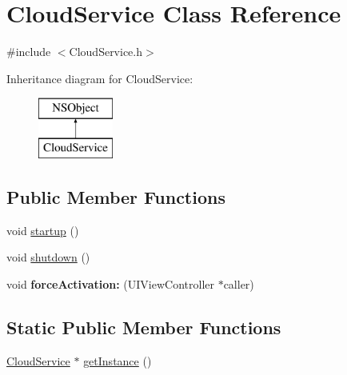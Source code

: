 \hypertarget{interface_cloud_service}{
\section{\-Cloud\-Service \-Class \-Reference}
\label{interface_cloud_service}
}


{\ttfamily \#include $<$\-Cloud\-Service.\-h$>$}

\-Inheritance diagram for \-Cloud\-Service\-:\begin{figure}[H]
\begin{center}
\leavevmode
\includegraphics[height=2.000000cm]{interface_cloud_service}
\end{center}
\end{figure}
\subsection*{\-Public \-Member \-Functions}
\begin{DoxyCompactItemize}
\item 
void \hyperlink{interface_cloud_service_aff6031f833c1fb320f87426fca9e11eb}{startup} ()
\item 
void \hyperlink{interface_cloud_service_ad3ebffc5f1cddabf2480d14d987de69f}{shutdown} ()
\item 
\hypertarget{interface_cloud_service_a59f48bd9bd6a06315ec5f1e946cfb1c1}{
void {\bfseries force\-Activation\-:} (\-U\-I\-View\-Controller $\ast$caller)}
\label{interface_cloud_service_a59f48bd9bd6a06315ec5f1e946cfb1c1}

\end{DoxyCompactItemize}
\subsection*{\-Static \-Public \-Member \-Functions}
\begin{DoxyCompactItemize}
\item 
\hyperlink{interface_cloud_service}{\-Cloud\-Service} $\ast$ \hyperlink{interface_cloud_service_ac78380c69d50df0d62403cbb74e3567f}{get\-Instance} ()
\end{DoxyCompactItemize}
